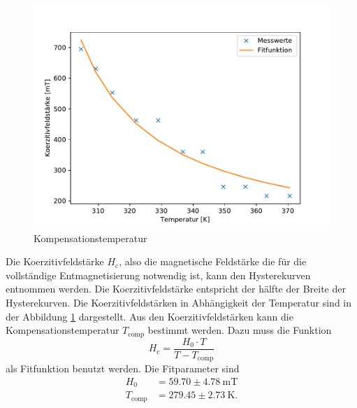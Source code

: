 \begin{figure}[H]
\centering
\includegraphics[scale=0.8]{../Messdaten/auswertung/Kompensationstemperatur.pdf}
\caption{Kompensationstemperatur}
\label{fig:koerzitivfeldstaerke}
\end{figure}

Die Koerzitivfeldstärke $H_\mathrm{c}$, also die magnetische Feldstärke die für die vollständige Entmagnetisierung notwendig ist, kann den Hysterekurven entnommen werden. 
Die Koerzitivfeldstärke entspricht der hälfte der Breite der Hysterekurven. 
Die Koerzitivfeldstärken in Abhängigkeit der Temperatur sind in der Abbildung \ref{fig:koerzitivfeldstaerke} dargestellt. 
Aus den Koerzitivfeldstärken kann die Kompensationstemperatur $T_\mathrm{comp}$ bestimmt  
werden.
Dazu muss die Funktion  
\begin{equation}
H_\mathrm{c} = \frac{H_0 \cdot T}{T-T_\mathrm{comp}}
\label{eq:koerzitivfeldstaerke} 
\end{equation}
als Fitfunktion benutzt werden.
Die Fitparameter sind
\begin{align}
H_0 & = 59.70 \pm 4.78\ \mathrm{mT}\\
T_\mathrm{comp} & = 279.45 \pm 2.73\ \mathrm{K} .
\label{eq:fitwerte}
\end{align}

 
